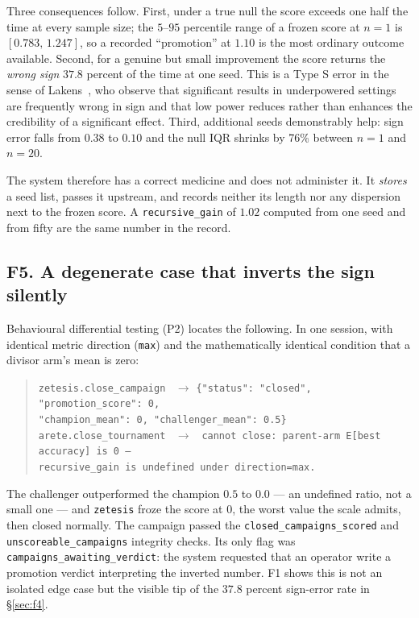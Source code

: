 \documentclass[10pt,twocolumn,letterpaper]{article}
\newcommand{\code}[1]{\texttt{#1}}
\begin{document}
Three consequences follow. First, under a true null the score exceeds one half the time at every
sample size; the $5$--$95$ percentile range of a frozen score at $n=1$ is $[0.783,\,1.247]$, so a
recorded ``promotion'' at $1.10$ is the most ordinary outcome available. Second, for a genuine but
small improvement the score returns the \emph{wrong sign} $37.8$ percent of the time at one seed.
This is a Type S error in the sense of Lakens~\cite{gelman2014}, who observe that significant
results in underpowered settings are frequently wrong in sign and that low power reduces rather
than enhances the credibility of a significant effect. Third, additional seeds demonstrably help:
sign error falls from $0.38$ to $0.10$ and the null IQR shrinks by 76\% between $n=1$ and $n=20$.

The system therefore has a correct medicine and does not administer it. It \emph{stores} a seed
list, passes it upstream, and records neither its length nor any dispersion next to the frozen
score. A \code{recursive\_gain} of $1.02$ computed from one seed and from fifty are the same
number in the record.

\subsection{F5. A degenerate case that inverts the sign silently}
\label{sec:f5}

Behavioural differential testing (P2) locates the following. In one session, with identical metric
direction (\code{max}) and the mathematically identical condition that a divisor arm's mean is
zero:

\begin{quote}\small
\code{zetesis.close\_campaign} \ $\rightarrow$ \code{\{"status": "closed", "promotion\_score": 0,}\\
\hspace*{5.5em}\code{"champion\_mean": 0, "challenger\_mean": 0.5\}}\\[2pt]
\code{arete.close\_tournament} \ $\rightarrow$ \ \code{cannot close: parent-arm E[best accuracy] is 0 ---}\\
\hspace*{5.5em}\code{recursive\_gain is undefined under direction=max.}
\end{quote}

The challenger outperformed the champion $0.5$ to $0.0$ --- an undefined ratio, not a small one ---
and \code{zetesis} froze the score at $0$, the worst value the scale admits, then closed normally.
The campaign passed the \code{closed\_campaigns\_scored} and \code{unscoreable\_campaigns}
integrity checks. Its only flag was \code{campaigns\_awaiting\_verdict}: the system requested that
an operator write a promotion verdict interpreting the inverted number. F1 shows this is not an
isolated edge case but the visible tip of the $37.8$ percent sign-error rate in
\S\ref{sec:f4}.
\end{document}
